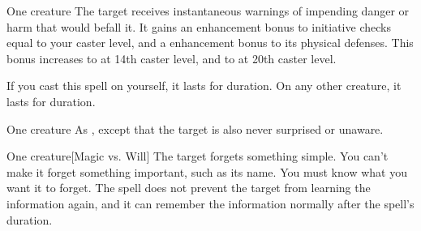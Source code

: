 \begin{spellheader}
\end{spellheader}
\begin{spelleffects}
    \begin{spelltarget}{One creature}
        \spelleffect The target receives instantaneous warnings of impending danger or harm that would befall it. It gains an enhancement bonus to initiative checks equal to your caster level, and a  enhancement bonus to its physical defenses. This bonus increases to  at 14th caster level, and to  at 20th caster level.
        \par If you cast this spell on yourself, it lasts for \durlong duration. On any other creature, it lasts for \durshort duration.
    \end{spelltarget}
\end{spelleffects}
\begin{spellfooter}
    
\end{spellfooter}

\begin{spellheader}
\end{spellheader}
\begin{spelleffects}
    \begin{spelltarget}{One creature}
        \spelleffect As , except that the target is also never surprised or unaware.
    \end{spelltarget}
\end{spelleffects}
\begin{spellfooter}
    
\end{spellfooter}

\begin{spellheader}
    \spellrng{\rngmed}
    \spelldur{\durlong}
\end{spellheader}
\begin{spelleffects}
    \begin{spelltarget}{One creature}[Magic vs. Will]
        \spelleffect The target forgets something simple. You can't make it forget something important, such as its name. You must know what you want it to forget. The spell does not prevent the target from learning the information again, and it can remember the information normally after the spell's duration.
    \end{spelltarget}
\end{spelleffects}
\begin{spellfooter}
    
\end{spellfooter}

